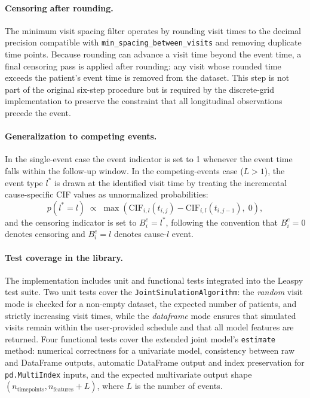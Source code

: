 \documentclass{rapportCS}
\begin{document}
\paragraph{Censoring after rounding.}
The minimum visit spacing filter operates by rounding visit times to the decimal precision compatible with \texttt{min\_spacing\_between\_visits} and removing duplicate time points. Because rounding can advance a visit time beyond the event time, a final censoring pass is applied after rounding: any visit whose rounded time exceeds the patient's event time is removed from the dataset. This step is not part of the original six-step procedure but is required by the discrete-grid implementation to preserve the constraint that all longitudinal observations precede the event.

\paragraph{Generalization to competing events.}
In the single-event case the event indicator is set to 1 whenever the event time falls within the follow-up window. In the competing-events case ($L > 1$), the event type $l^*$ is drawn at the identified visit time by treating the incremental cause-specific CIF values as unnormalized probabilities:
\begin{equation}
p(l^* = l) \;\propto\; \max\left(\text{CIF}_{i,l}(t_{i,j}) - \text{CIF}_{i,l}(t_{i,j-1}),\; 0\right),
\end{equation}
and the censoring indicator is set to $B^e_i = l^*$, following the convention that $B^e_i = 0$ denotes censoring and $B^e_i = l$ denotes cause-$l$ event.

\paragraph{Test coverage in the library.}
The implementation includes unit and functional tests integrated into the Leaspy test suite. Two unit tests cover the \texttt{JointSimulationAlgorithm}: the \textit{random} visit mode is checked for a non-empty dataset, the expected number of patients, and strictly increasing visit times, while the \textit{dataframe} mode ensures that simulated visits remain within the user-provided schedule and that all model features are returned. Four functional tests cover the extended joint model's \texttt{estimate} method: numerical correctness for a univariate model, consistency between raw and DataFrame outputs, automatic DataFrame output and index preservation for \texttt{pd.MultiIndex} inputs, and the expected multivariate output shape $(n_{\text{timepoints}}, n_{\text{features}} + L)$, where $L$ is the number of events.
\end{document}
